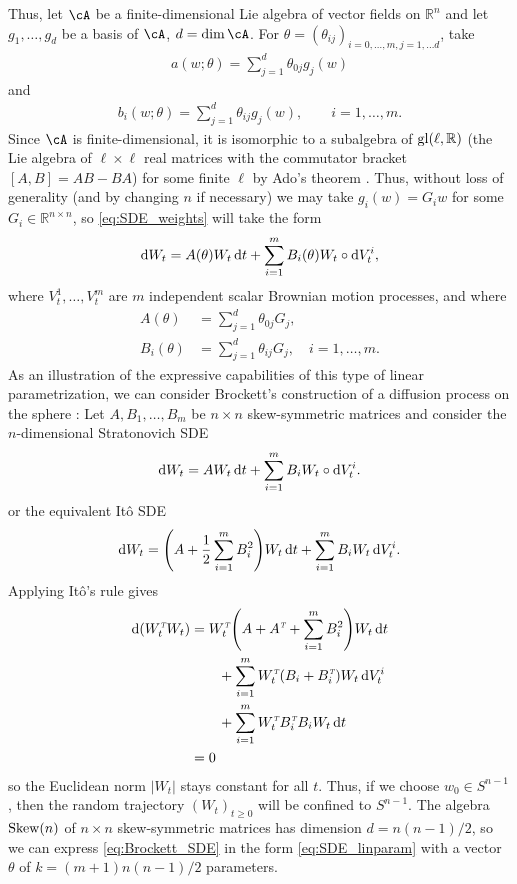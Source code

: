 \documentclass[letterpaper, 10pt, conference]{ieeeconf}
\def\Reals{{\mathbb R}}
\def\trn{{\hbox{\it\tiny T}}} %
\begin{document}
Thus, let $\cA$ be a finite-dimensional Lie algebra of vector fields on $\Reals^n$ and let $g_1,\dots,g_d$ be a basis of $\cA$, $d = \dim \cA$. For $\theta = (\theta_{ij})_{i = 0,\dots,m, j = 1,\dots d}$, take
\begin{align*}
	a(w;\theta) = \sum^d_{j=1} \theta_{0j} g_j(w)
\end{align*}
and
\begin{align*}
	b_i(w;\theta) = \sum^d_{j=1} \theta_{ij} g_j(w), \qquad i = 1, \dots, m.
\end{align*}
Since $\cA$ is finite-dimensional, it is isomorphic to a subalgebra of ${\rm gl}(\ell,\Reals)$ (the Lie algebra of $\ell \times \ell$ real matrices with the commutator bracket $[A,B] = AB - BA$) for some finite $\ell$ by Ado's theorem \cite{Varadarajan_Lie_groups}. Thus, without loss of generality (and by changing $n$ if necessary) we may take $g_i(w) = G_i w$ for some $G_i \in \Reals^{n \times n}$, so \eqref{eq:SDE_weights} will take the form
\begin{align}\label{eq:SDE_linparam}
	\dif W_t = A(\theta) W_t \dif t + \sum^m_{i=1} B_i(\theta)W_t \circ \dif V^i_t,
\end{align}
where $V^1_t,\dots,V^m_t$ are $m$ independent scalar Brownian motion processes, and where
\begin{align*}
	A(\theta) &= \sum^d_{j=1}\theta_{0j} G_j, \\
	B_i(\theta) &= \sum^d_{j=1}\theta_{ij} G_j, \quad i = 1, \dots, m.
\end{align*}
As an illustration of the expressive capabilities of this type of linear parametrization, we can consider Brockett's construction of a diffusion process on the sphere \cite{Brockett_spheres}: Let $A,B_1,\dots,B_m$ be $n \times n$ skew-symmetric matrices and consider the $n$-dimensional Stratonovich SDE
\begin{align}\label{eq:Brockett_SDE}
	\dif W_t = AW_t \dif t + \sum^m_{i=1} B_i W_t \circ \dif V^i_t.
\end{align}
or the equivalent It\^o SDE
\begin{align*}
	\dif W_t = \Bigg(A + \frac{1}{2}\sum^m_{i=1}B^2_i\Bigg)W_t \dif t + \sum^m_{i=1} B_i W_t \dif V^i_t.
\end{align*}
Applying It\^o's rule gives
\begin{align*}
	\dif\,(W^\trn_t W_t) &= 
	W^\trn_t \Bigg(A+A^\trn + \sum^m_{i=1}B^2_i\Bigg) W_t \dif t \nonumber\\
	&\qquad + \sum^m_{i=1} W^\trn_t (B_i + B^\trn_i) W_t  \dif V^i_t \\
	&\qquad + \sum^m_{i=1} W^\trn_t B^\trn_i B_i W_t \dif t \\
	& = 0
\end{align*}
so the Euclidean norm $|W_t|$ stays constant for all $t$. Thus, if we choose $w_0 \in S^{n-1}$, then the random trajectory $(W_t)_{t \ge 0}$ will be confined to $S^{n-1}$. The algebra ${\rm Skew}(n)$ of $n \times n$ skew-symmetric matrices has dimension $d = n(n-1)/2$, so we can express \eqref{eq:Brockett_SDE} in the form \eqref{eq:SDE_linparam} with a vector $\theta$ of $k = (m+1)n(n-1)/2$ parameters.
\end{document}
